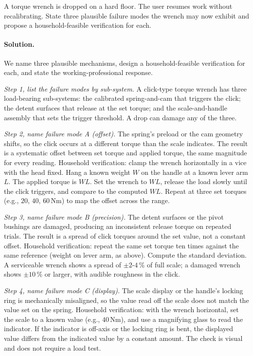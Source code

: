 \begin{exercise}
A torque wrench is dropped on a hard floor. The user resumes work
without recalibrating. State three plausible failure modes the wrench
may now exhibit and propose a household-feasible verification for
each.

\paragraph{Solution.}
We name three plausible mechanisms, design a household-feasible
verification for each, and state the working-professional response.

\textit{Step 1, list the failure modes by sub-system.} A click-type
torque wrench has three load-bearing sub-systems: the calibrated
spring-and-cam that triggers the click; the detent surfaces that
release at the set torque; and the scale-and-handle assembly that
sets the trigger threshold. A drop can damage any of the three.

\textit{Step 2, name failure mode A (offset).} The spring's preload
or the cam geometry shifts, so the click occurs at a different torque
than the scale indicates. The result is a systematic offset between
set torque and applied torque, the same magnitude for every reading.
Household verification: clamp the wrench horizontally in a vice with
the head fixed. Hang a known weight $W$ on the handle at a known
lever arm $L$. The applied torque is $W L$. Set the wrench to $W L$,
release the load slowly until the click triggers, and compare to the
computed $W L$. Repeat at three set torques (e.g.,
$20$, $40$, $60 \,\si{\newton\meter}$) to map the offset across the
range.

\textit{Step 3, name failure mode B (precision).} The detent surfaces
or the pivot bushings are damaged, producing an inconsistent release
torque on repeated trials. The result is a spread of click torques
around the set value, not a constant offset. Household verification:
repeat the same set torque ten times against the same reference
(weight on lever arm, as above). Compute the standard deviation. A
serviceable wrench shows a spread of $\pm 2$-$4\,\%$ of full scale;
a damaged wrench shows $\pm 10\,\%$ or larger, with audible roughness
in the click.

\textit{Step 4, name failure mode C (display).} The scale display or
the handle's locking ring is mechanically misaligned, so the value
read off the scale does not match the value set on the spring.
Household verification: with the wrench horizontal, set the scale to
a known value (e.g., $40 \,\si{\newton\meter}$), and use a magnifying
glass to read the indicator. If the indicator is off-axis or the
locking ring is bent, the displayed value differs from the indicated
value by a constant amount. The check is visual and does not require
a load test.


\end{exercise}
